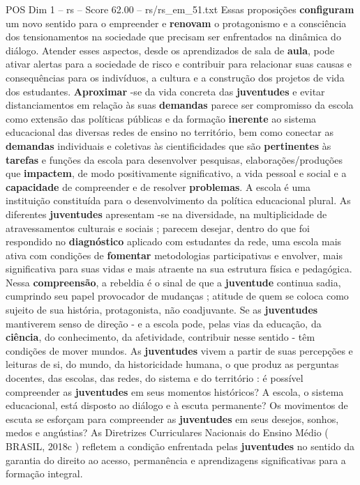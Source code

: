 \begin{textsample}{POS Dim 1 – rs – Score 62.00 – rs/rs\_em\_51.txt}
Essas proposições \textbf{configuram} um novo sentido para o empreender e \textbf{renovam} o protagonismo e a consciência dos tensionamentos na sociedade que precisam ser enfrentados na dinâmica do diálogo.
Atender esses aspectos, desde os aprendizados de sala de \textbf{aula}, pode ativar alertas para a sociedade de risco e contribuir para relacionar suas causas e consequências para os indivíduos, a cultura e a construção dos projetos de vida dos estudantes. \textbf{Aproximar} -se da vida concreta das \textbf{juventudes} e evitar distanciamentos em relação às suas \textbf{demandas} parece ser compromisso da escola como extensão das políticas públicas e da formação \textbf{inerente} ao sistema educacional das diversas redes de ensino no território, bem como conectar as \textbf{demandas} individuais e coletivas às cientificidades que são \textbf{pertinentes} às \textbf{tarefas} e funções da escola para desenvolver pesquisas, elaborações/produções que \textbf{impactem}, de modo positivamente significativo, a vida pessoal e social e a \textbf{capacidade} de compreender e de resolver \textbf{problemas}.
A escola é uma instituição constituída para o desenvolvimento da política educacional plural.
As diferentes \textbf{juventudes} apresentam -se na diversidade, na multiplicidade de atravessamentos culturais e sociais ; parecem desejar, dentro do que foi respondido no \textbf{diagnóstico} aplicado com estudantes da rede, uma escola mais ativa com condições de \textbf{fomentar} metodologias participativas e envolver, mais significativa para suas vidas e mais atraente na sua estrutura física e pedagógica.
Nessa \textbf{compreensão}, a rebeldia é o sinal de que a \textbf{juventude} continua sadia, cumprindo seu papel provocador de mudanças ; atitude de quem se coloca como sujeito de sua história, protagonista, não coadjuvante.
Se as \textbf{juventudes} mantiverem senso de direção - e a escola pode, pelas vias da educação, da \textbf{ciência}, do conhecimento, da afetividade, contribuir nesse sentido - têm condições de mover mundos.
As \textbf{juventudes} vivem a partir de suas percepções e leituras de si, do mundo, da historicidade humana, o que produz as perguntas docentes, das escolas, das redes, do sistema e do território : é possível compreender as \textbf{juventudes} em seus momentos históricos?
A escola, o sistema educacional, está disposto ao diálogo e à escuta permanente?
Os movimentos de escuta se esforçam para compreender as \textbf{juventudes} em seus desejos, sonhos, medos e angústias?
As Diretrizes Curriculares Nacionais do Ensino Médio ( BRASIL, 2018c ) refletem a condição enfrentada pelas \textbf{juventudes} no sentido da garantia do direito ao acesso, permanência e aprendizagens significativas para a formação integral.

\end{textsample}
